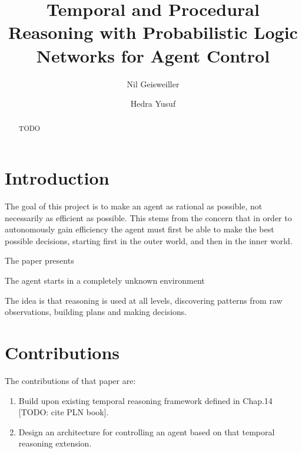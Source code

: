 \documentclass[runningheads]{llncs}
\begin{document}
%
\title{Temporal and Procedural Reasoning with Probabilistic Logic
  Networks for Agent Control}

%
\author{Nil Geisweiller
  \and Hedra Yusuf}
%
%
%
\maketitle              %
%

\begin{abstract}
  TODO

\end{abstract}

\section{Introduction}

The goal of this project is to make an agent as rational as possible,
not necessarily as efficient as possible.  This stems from the concern
that in order to autonomously gain efficiency the agent must first be
able to make the best possible decisions, starting first in the outer
world, and then in the inner world.

The paper presents

The agent starts in a completely unknown environment

The idea is that reasoning is used at all levels, discovering patterns
from raw observations, building plans and making decisions.

\section{Contributions}

The contributions of that paper are:
\begin{enumerate}
\item Build upon existing temporal reasoning framework defined in
  Chap.14 [TODO: cite PLN book].
\item Design an architecture for controlling an agent based on that
  temporal reasoning extension.
\end{enumerate}
\end{document}
